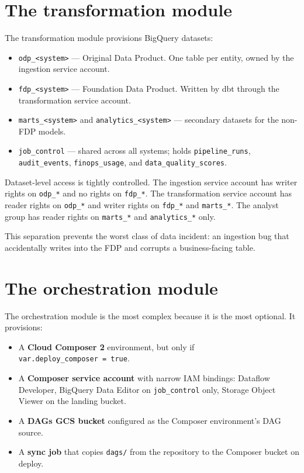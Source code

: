 \documentclass[
  11pt,
  british,
  oneside]{book}
\providecommand{\tightlist}{%
  \setlength{\itemsep}{0pt}\setlength{\parskip}{0pt}}
\begin{document}
\hypertarget{the-transformation-module}{%
\section{The transformation module}\label{the-transformation-module}}

The transformation module provisions BigQuery datasets:

\begin{itemize}
\tightlist
\item
  \texttt{odp\_\textless{}system\textgreater{}} --- Original Data
  Product. One table per entity, owned by the ingestion service account.
\item
  \texttt{fdp\_\textless{}system\textgreater{}} --- Foundation Data
  Product. Written by dbt through the transformation service account.
\item
  \texttt{marts\_\textless{}system\textgreater{}} and
  \texttt{analytics\_\textless{}system\textgreater{}} --- secondary
  datasets for the non-FDP models.
\item
  \texttt{job\_control} --- shared across all systems; holds
  \texttt{pipeline\_runs}, \texttt{audit\_events},
  \texttt{finops\_usage}, and \texttt{data\_quality\_scores}.
\end{itemize}

Dataset-level access is tightly controlled. The ingestion service
account has writer rights on \texttt{odp\_*} and no rights on
\texttt{fdp\_*}. The transformation service account has reader rights on
\texttt{odp\_*} and writer rights on \texttt{fdp\_*} and
\texttt{marts\_*}. The analyst group has reader rights on
\texttt{marts\_*} and \texttt{analytics\_*} only.

This separation prevents the worst class of data incident: an ingestion
bug that accidentally writes into the FDP and corrupts a business-facing
table.

\hypertarget{the-orchestration-module}{%
\section{The orchestration module}\label{the-orchestration-module}}

The orchestration module is the most complex because it is the most
optional. It provisions:

\begin{itemize}
\tightlist
\item
  A \textbf{Cloud Composer 2} environment, but only if
  \texttt{var.deploy\_composer\ =\ true}.
\item
  A \textbf{Composer service account} with narrow IAM bindings: Dataflow
  Developer, BigQuery Data Editor on \texttt{job\_control} only, Storage
  Object Viewer on the landing bucket.
\item
  A \textbf{DAGs GCS bucket} configured as the Composer environment's
  DAG source.
\item
  A \textbf{sync job} that copies \texttt{dags/} from the repository to
  the Composer bucket on deploy.
\end{itemize}
\end{document}
